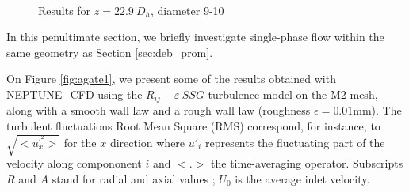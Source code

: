 \begin{figure}[!h]
\centering
{}
\\
\caption{Results for $z=22.9\ D_{h}$, diameter 9-10}
\end{figure}


In this penultimate section, we briefly investigate single-phase flow within the same geometry as Section \ref{sec:deb_prom}.


On Figure \ref{fig:agate1}, we present some of the results obtained with NEPTUNE\_CFD using the $R_{ij}-\varepsilon~SSG$ turbulence model on the M2 mesh, along with a smooth wall law and a rough wall law (roughness $\epsilon=0.01$mm). The turbulent fluctuations Root Mean Square (RMS) correspond, for instance, to $\sqrt{<u^{'^{2}}_{x}>}$ for the $x$ direction where $u'_{i}$ represents the fluctuating part of the velocity along compononent $i$ and $<.>$ the time-averaging operator. Subscripts $R$ and $A$ stand for radial and axial values ; $U_{0}$ is the average inlet velocity.


